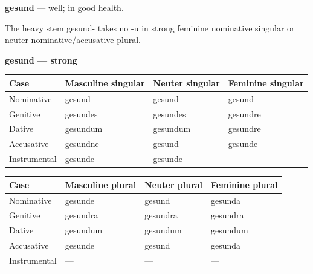 \par\begin{minipage}{\linewidth}\raggedright
\textbf{gesund} — well; in good health.

The heavy stem gesund- takes no -u in strong feminine nominative singular or neuter nominative/\allowbreak{}accusative plural.

\textbf{gesund — strong}

\par\begingroup
\fontsize{10.5}{13.2}\selectfont
\setlength{\LTleft}{0pt}\setlength{\LTright}{\fill}
\noindent
\begin{tabular}{@{}>{\raggedright\arraybackslash}p{22.0mm}>{\raggedright\arraybackslash}p{31.188mm}>{\raggedright\arraybackslash}p{31.188mm}>{\raggedright\arraybackslash}p{31.188mm}@{}}
\toprule
\textbf{Case} & \textbf{Masculine singular} & \textbf{Neuter singular} & \textbf{Feminine singular} \\
\midrule
Nominative & gesund & gesund & gesund \\
Genitive & gesundes & gesundes & gesundre \\
Dative & gesundum & gesundum & gesundre \\
Accusative & gesundne & gesund & gesunde \\
Instrumental & gesunde & gesunde & — \\
\bottomrule
\end{tabular}
\par\endgroup
\end{minipage}\par
\par\addvspace{5pt}
\par\begingroup
\fontsize{10.5}{13.2}\selectfont
\setlength{\LTleft}{0pt}\setlength{\LTright}{\fill}
\noindent
\begin{tabular}{@{}>{\raggedright\arraybackslash}p{22.0mm}>{\raggedright\arraybackslash}p{31.188mm}>{\raggedright\arraybackslash}p{31.188mm}>{\raggedright\arraybackslash}p{31.188mm}@{}}
\toprule
\textbf{Case} & \textbf{Masculine plural} & \textbf{Neuter plural} & \textbf{Feminine plural} \\
\midrule
Nominative & gesunde & gesund & gesunda \\
Genitive & gesundra & gesundra & gesundra \\
Dative & gesundum & gesundum & gesundum \\
Accusative & gesunde & gesund & gesunda \\
Instrumental & — & — & — \\
\bottomrule
\end{tabular}
\par\endgroup

